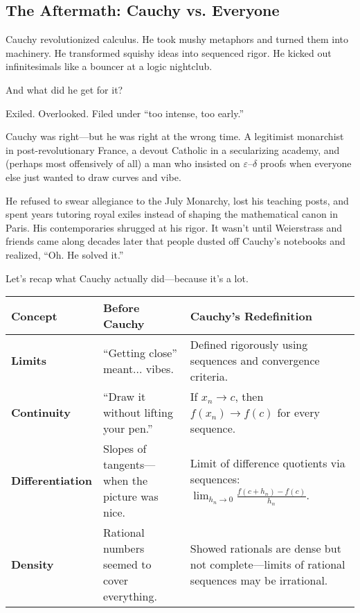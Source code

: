 \subsection{The Aftermath: Cauchy vs. Everyone}

Cauchy revolutionized calculus. He took mushy metaphors and turned them into machinery. He transformed squishy ideas into sequenced rigor. He kicked out infinitesimals like a bouncer at a logic nightclub.

And what did he get for it?

Exiled. Overlooked. Filed under “too intense, too early.”

Cauchy was right—but he was right at the wrong time. A legitimist monarchist in post-revolutionary France, a devout Catholic in a secularizing academy, and (perhaps most offensively of all) a man who insisted on $\varepsilon$–$\delta$ proofs when everyone else just wanted to draw curves and vibe.

He refused to swear allegiance to the July Monarchy, lost his teaching posts, and spent years tutoring royal exiles instead of shaping the mathematical canon in Paris. His contemporaries shrugged at his rigor. It wasn’t until Weierstrass and friends came along decades later that people dusted off Cauchy’s notebooks and realized, “Oh. He solved it.”

Let’s recap what Cauchy actually did—because it’s a lot.

\begin{center}
\renewcommand{\arraystretch}{1.4}
\begin{tabular}{|p{3.5cm}|p{5cm}|p{5cm}|}
\hline
\textbf{Concept} & \textbf{Before Cauchy} & \textbf{Cauchy’s Redefinition} \\
\hline
\textbf{Limits} & “Getting close” meant... vibes. & Defined rigorously using sequences and convergence criteria. \\
\hline
\textbf{Continuity} & “Draw it without lifting your pen.” & If $x_n \to c$, then $f(x_n) \to f(c)$ for every sequence. \\
\hline
\textbf{Differentiation} & Slopes of tangents—when the picture was nice. & Limit of difference quotients via sequences: $\displaystyle \lim_{h_n \to 0} \frac{f(c + h_n) - f(c)}{h_n}$. \\
\hline
\textbf{Density} & Rational numbers seemed to cover everything. & Showed rationals are dense but not complete—limits of rational sequences may be irrational. \\
\hline
\end{tabular}
\end{center}


